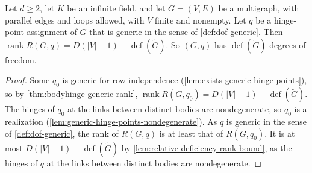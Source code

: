 \begin{corollary}
  \label{cor:dof-generic-realization}
  \leanok
  Let $d \ge 2$, let $K$ be an infinite field, and let $G = (V, E)$ be
  a multigraph, with parallel edges and loops allowed, with $V$ finite
  and nonempty. Let $q$ be a hinge-point assignment of $G$ that is
  generic in the sense of \cref{def:dof-generic}. Then
  $\operatorname{rank} R(G,q) = D(|V|-1) - \operatorname{def}(\tilde G)$.
  So $(G,q)$ has $\operatorname{def}(\tilde G)$ degrees of freedom.
\end{corollary}
\begin{proof}
  \leanok
  Some $q_0$ is generic for row independence
  (\cref{lem:exists-generic-hinge-points}), so by
  \cref{thm:bodyhinge-generic-rank},
  $\operatorname{rank} R(G,q_0) = D(|V|-1) - \operatorname{def}(\tilde G)$.
  The hinges of $q_0$ at the links between distinct bodies are
  nondegenerate, so $q_0$ is a realization
  (\cref{lem:generic-hinge-points-nondegenerate}). As $q$ is generic in
  the sense of \cref{def:dof-generic}, the rank of $R(G,q)$ is at least
  that of $R(G,q_0)$. It is at most
  $D(|V|-1) - \operatorname{def}(\tilde G)$ by
  \cref{lem:relative-deficiency-rank-bound}, as the hinges of $q$ at
  the links between distinct bodies are nondegenerate.
\end{proof}

